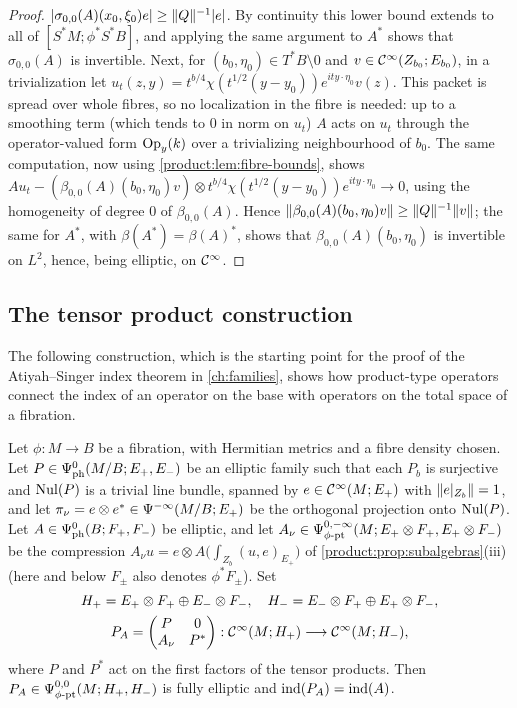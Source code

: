 \begin{proof}
$|\sigma_{0,0}(A)(x_0,\xi_0)e|\ge\lVert Q\rVert^{-1}|e|$. By continuity this lower bound
extends to all of $[S^*M;\phi^*S^*B]$, and applying the same argument to $A^*$ shows
that $\sigma_{0,0}(A)$ is invertible. Next, for $(b_0,\eta_0)\in T^*B\setminus0$ and
$v\in\mathcal{C}^\infty(Z_{b_0};E_{b_0})$, in a trivialization let
$u_t(z,y)=t^{b/4}\chi(t^{1/2}(y-y_0))e^{ity\cdot\eta_0}v(z)$. This packet is spread
over whole fibres, so no localization in the fibre is needed: up to a smoothing
term (which tends to $0$ in norm on $u_t$) $A$ acts on $u_t$ through the
operator-valued form $\operatorname{Op}_y(k)$ over a trivializing neighbourhood of $b_0$. The
same computation, now using
\cref{product:lem:fibre-bounds}, shows $Au_t-(\beta_{0,0}(A)(b_0,\eta_0)v)\otimes
t^{b/4}\chi(t^{1/2}(y-y_0))e^{ity\cdot\eta_0}\to0$, using the homogeneity of degree
$0$ of $\beta_{0,0}(A)$. Hence $\lVert \beta_{0,0}(A)(b_0,\eta_0)v\rVert\ge\lVert Q\rVert^{-1}
\lVert v\rVert$; the same for $A^*$, with $\beta(A^*)=\beta(A)^*$, shows that
$\beta_{0,0}(A)(b_0,\eta_0)$ is invertible on $L^2$, hence, being elliptic, on $\mathcal{C}^\infty$.
\end{proof}

\subsection{The tensor product construction}
The following construction, which is the starting point for the proof of the
Atiyah--Singer index theorem in \cref{ch:families}, shows how product-type
operators connect the index of an operator on the base with operators on the total
space of a fibration.

\begin{proposition}\label{product:prop:tensor}
Let $\phi:M\longrightarrow B$ be a fibration, with Hermitian metrics and a fibre
density chosen. Let $P\in\Psi^{0}_{\mathrm{ph}}(M/B;E_+,E_-)$ be an elliptic family such that each
$P_b$ is surjective and $\operatorname{Nul}(P)$ is a trivial line bundle, spanned by
$e\in\mathcal{C}^\infty(M;E_+)$ with $\lVert e|_{Z_b}\rVert=1$, and let $\pi_\nu=e\otimes e^*\in
\Psi^{-\infty}(M/B;E_+)$ be the orthogonal projection onto $\operatorname{Nul}(P)$. Let
$A\in\Psi^{0}_{\mathrm{ph}}(B;F_+,F_-)$ be elliptic, and let $A_\nu\in\Psi^{0,-\infty}_{\phi\text{-}\mathrm{pt}}(M;E_+\otimes
F_+,E_+\otimes F_-)$ be the compression $A_\nu u=e\otimes A\big(\int_{Z_b}(u,e)_{E_+}\big)$
of \cref{product:prop:subalgebras}(iii) (here and below $F_\pm$ also denotes
$\phi^*F_\pm$). Set
\begin{gather*}
H_+=E_+\otimes F_+\oplus E_-\otimes F_-,\quad H_-=E_-\otimes F_+\oplus E_+\otimes F_-,
\\
P_A=\begin{pmatrix}P&0\\A_\nu&P^*\end{pmatrix}:\mathcal{C}^\infty(M;H_+)\longrightarrow\mathcal{C}^\infty(M;H_-),
\end{gather*}
where $P$ and $P^*$ act on the first factors of the tensor products. Then
$P_A\in\Psi^{0,0}_{\phi\text{-}\mathrm{pt}}(M;H_+,H_-)$ is fully elliptic and $\operatorname{ind}(P_A)=\operatorname{ind}(A)$.
\end{proposition}

